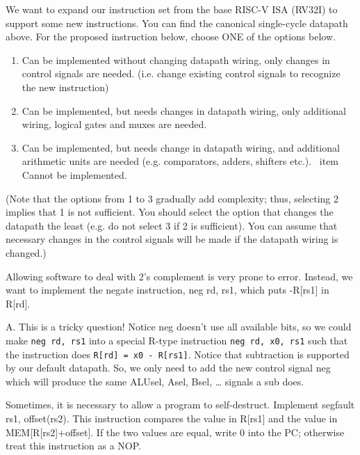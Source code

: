\begin{blocksection}
\question
We want to expand our instruction set from the base RISC-­V ISA (RV32I) to support some new instructions. You can find the canonical single-cycle datapath above. For the proposed instruction below, choose ONE of the options below.

\begin{enumerate}
    \item Can be implemented without changing datapath wiring, only changes in control signals are needed. (i.e. change existing control signals to recognize the new instruction)
    \item Can be implemented, but needs changes in datapath wiring, only additional wiring, logical gates and muxes are needed.
    \item Can be implemented, but needs change in datapath wiring, and additional arithmetic units are needed (e.g. comparators, adders, shifters etc.).
    \ item Cannot be implemented.
\end{enumerate}

(Note that the options from 1 to 3 gradually add complexity; thus, selecting 2 implies that 1 is not sufficient. You should select the option that changes the datapath the least (e.g. do not select 3 if 2 is sufficient). You can assume that necessary changes in the control signals will be made if the datapath wiring is changed.)

\begin{parts}

\item Allowing software to deal with 2’s complement is very prone to error. Instead, we want to implement the negate instruction, neg rd, rs1, which puts -R[rs1] in R[rd].

\begin{solution}[0.5in]
A. This is a tricky question! Notice neg doesn’t use all available bits, so we could make \texttt{neg rd, rs1} into a special R-type instruction \texttt{neg rd, x0, rs1} such that the instruction does \texttt{R[rd] = x0 - R[rs1]}. Notice that subtraction is supported by our default datapath. So, we only need to add the new control signal neg which will produce the same ALUsel, Asel, Bsel, … signals a sub does.
\end{solution}
\newline
\newline
\newline
\newline
\newline
\newline
\newline
\newline
\item Sometimes, it is necessary to allow a program to self­-destruct. Implement segfault rs1, offset(rs2). This instruction compares the value in R[rs1] and the value in MEM[R[rs2]+offset]. If the two values are equal, write 0 into the PC; otherwise treat this instruction as a NOP.


\end{parts}
\end{blocksection}
